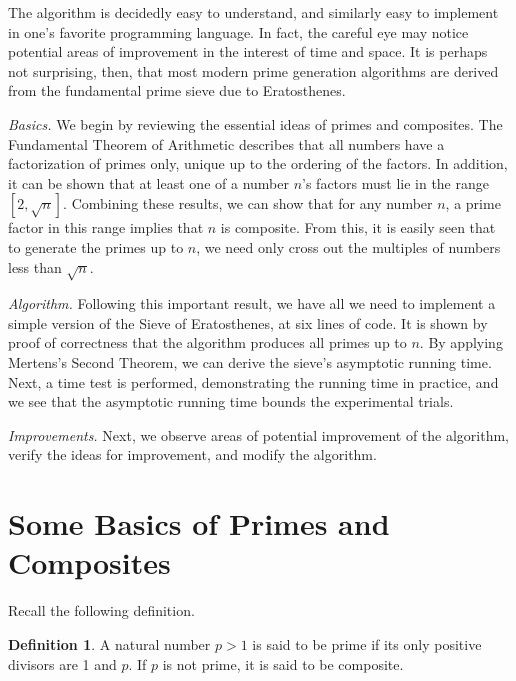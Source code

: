 \documentclass{amsart}
\theoremstyle{definition}
\newtheorem{definition}{Definition}[section]
\theoremstyle{case}
\begin{document}
    The algorithm is decidedly easy to understand, and similarly easy to implement in one's favorite programming language. In fact, the careful eye may notice potential areas of improvement in the interest of time and space. It is perhaps not surprising, then, that most modern prime generation algorithms are derived from the fundamental prime sieve due to Eratosthenes.
    
    \textit{Basics.} We begin by reviewing the essential ideas of primes and composites. The Fundamental Theorem of Arithmetic describes that all numbers have a factorization of primes only, unique up to the ordering of the factors. In addition, it can be shown that at least one of a number $n$'s factors must lie in the range $[2, \sqrt{n}]$. Combining these results, we can show that for any number $n$, a prime factor in this range implies that $n$ is composite. From this, it is easily seen that to generate the primes up to $n$, we need only cross out the multiples of numbers less than $\sqrt{n}$.
    
    \textit{Algorithm.} Following this important result, we have all we need to implement a simple version of the Sieve of Eratosthenes, at six lines of code. It is shown by proof of correctness that the algorithm produces all primes up to $n$. By applying Mertens's Second Theorem, we can derive the sieve's asymptotic running time. Next, a time test is performed, demonstrating the running time in practice, and we see that the asymptotic running time bounds the experimental trials.
    
    \textit{Improvements.} Next, we observe areas of potential improvement of the algorithm, verify the ideas for improvement, and modify the algorithm. 
    
    
    \section{Some Basics of Primes and Composites}
    

	Recall the following definition.
	\begin{definition}
		A natural number $p>1$ is said to be prime if its only positive divisors are 1 and $p$. If $p$ is not prime, it is said to be composite.
	\end{definition}
	
\end{document}
